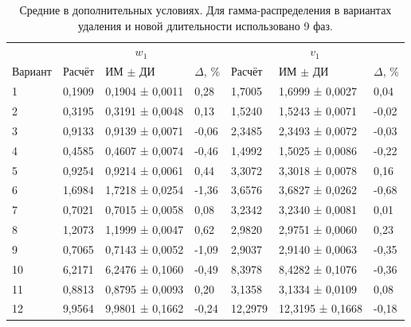 \documentclass[a4paper,12pt]{article}
\begin{document}
\begin{table}[!htbp]
\centering\small\setlength{\tabcolsep}{2pt}
\begin{tabular}{@{}p{4.16cm}p{1.61cm}p{2.83cm}p{1.28cm}p{1.61cm}p{2.83cm}p{1.28cm}@{}}
\toprule
 & \multicolumn{3}{c}{$w_1$} & \multicolumn{3}{c}{$v_1$} \\
Вариант & Расчёт & ИМ $\pm$ ДИ & $\Delta$, \% & Расчёт & ИМ $\pm$ ДИ & $\Delta$, \% \\
\midrule
1 & 0,1909 & 0,1904 ± 0,0011 & 0,28 & 1,7005 & 1,6999 ± 0,0027 & 0,04 \\
2 & 0,3195 & 0,3191 ± 0,0048 & 0,13 & 1,5240 & 1,5243 ± 0,0071 & -0,02 \\
3 & 0,9133 & 0,9139 ± 0,0071 & -0,06 & 2,3485 & 2,3493 ± 0,0072 & -0,03 \\
4 & 0,4585 & 0,4607 ± 0,0074 & -0,46 & 1,4992 & 1,5025 ± 0,0086 & -0,22 \\
5 & 0,9254 & 0,9214 ± 0,0061 & 0,44 & 3,3072 & 3,3018 ± 0,0078 & 0,16 \\
6 & 1,6984 & 1,7218 ± 0,0254 & -1,36 & 3,6576 & 3,6827 ± 0,0262 & -0,68 \\
7 & 0,7021 & 0,7015 ± 0,0058 & 0,08 & 3,2342 & 3,2340 ± 0,0081 & 0,01 \\
8 & 1,2073 & 1,1999 ± 0,0047 & 0,62 & 2,9820 & 2,9751 ± 0,0060 & 0,23 \\
9 & 0,7065 & 0,7143 ± 0,0052 & -1,09 & 2,9037 & 2,9140 ± 0,0063 & -0,35 \\
10 & 6,2171 & 6,2476 ± 0,1060 & -0,49 & 8,3978 & 8,4282 ± 0,1076 & -0,36 \\
11 & 0,8813 & 0,8795 ± 0,0093 & 0,20 & 3,1358 & 3,1334 ± 0,0109 & 0,08 \\
12 & 9,9564 & 9,9801 ± 0,1662 & -0,24 & 12,2979 & 12,3195 ± 0,1668 & -0,18 \\
\bottomrule
\end{tabular}
\caption{Средние в дополнительных условиях. Для гамма-распределения в вариантах удаления и новой длительности использовано 9 фаз.}
\label{tab:studymeans}
\end{table}
\end{document}

